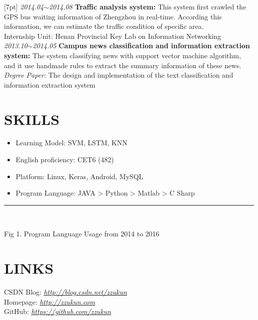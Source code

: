 \documentclass[line, margin]{res}
\newcommand{\xiaowu}{\fontsize{9pt}{15.75pt}\selectfont} %
\begin{document}
\begin{resume}
[7pt]
 {\sl 2014.04$\sim$2014.08} \textbf{Traffic analysis system: }
 { This system first crawled the GPS bus waiting information of Zhengzhou in real-time. According this information, we can estimate the traffic condition of specific area.}\\
 {\xiaowu Internship Unit: Henan Provincial Key Lab on Information Networking }\\
[7pt]
 {\sl 2013.10$\sim$2014.05} \textbf{Campus news classification and information extraction system: }
 {The system classifying news with support vector machine algorithm, and it use handmade rules to extract the summary information of these news.}\\
   {\sl\xiaowu Degree Paper:} {\xiaowu The design and implementation of the text classification and information extraction system} \\
 
\section{SKILLS}
\begin{itemize}
\item { Learning Model: }SVM, LSTM, KNN
\item { English proficiency: CET6 (482)}
\item { Platform: Linux, Keras, Android, MySQL}
\item { Program Language: }JAVA > Python > Matlab > C Sharp
\end{itemize}

\rule{13.0cm}{0.05em} \\
\begin{center}
{\xiaowu Fig 1. Program Language Usage from 2014 to 2016}
\end{center}

\vspace {30pt}
\section {LINKS}
{ CSDN Blog:} {\sl \url{http://blog.csdn.net/zzukun}}\\
[3pt]
{ Homepage:} {\sl \url{http://zzukun.com}}\\
[3pt]
{ GitHub: } {\sl \url{https://github.com/zzukun}}\\

\end{resume}
\end{document}
